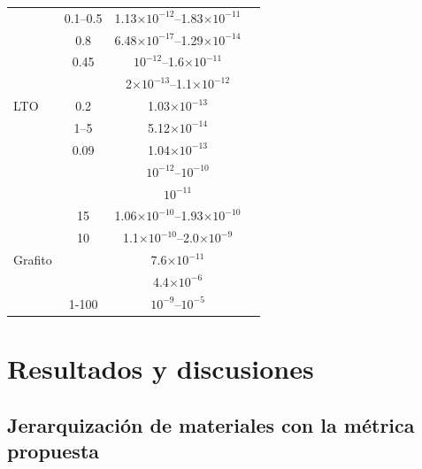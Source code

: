 \begin{table}[h!]
{\begin{tabular}{l c c r}
            & 0.1--0.5 & 1.13$\times10^{-12}$--1.83$\times10^{-11}$ & \cite{yan2020nickel} \\
            & 0.8 & 6.48$\times10^{-17}$--1.29$\times10^{-14}$ & \cite{prosini2002determination} \\
        \midrule
            & 0.45 & $10^{-12}$--1.6$\times10^{-11}$ & \cite{takami2011lithium} \\
            &  & 2$\times10^{-13}$--1.1$\times10^{-12}$ & \cite{shi2020crystal} \\
        LTO & 0.2 & 1.03$\times10^{-13}$ & \cite{kawade2018surface} \\
            & 1--5 & 5.12$\times10^{-14}$ & \cite{wang2019unveiling} \\
            & 0.09 & 1.04$\times10^{-13}$ & \cite{wang2018synthesis} \\
            &  & $10^{-12}$--$10^{-10}$ & \cite{rho2004li} \\
        \midrule
                &  & $10^{-11}$ & \cite{adams2019temperature} \\
                & 15 & 1.06$\times10^{-10}$--1.93$\times10^{-10}$ & \cite{gruet2018electrochemical} \\
                & 10 & 1.1$\times10^{-10}$--2.0$\times10^{-9}$ & \cite{cabanero2018direct} \\
        Grafito &  & 7.6$\times10^{-11}$ & \cite{umegaki2017li} \\
                &  & 4.4$\times10^{-6}$ & \cite{persson2010lithium} \\
                & 1-100 & $10^{-9}$--$10^{-5}$ & \cite{funabiki1998impedance} \\
        \bottomrule
    \end{tabular}
    }{}
    \label{t:dataset}
\end{table}


\section{Resultados y discusiones}

\subsection{Jerarquización de materiales con la métrica propuesta}

